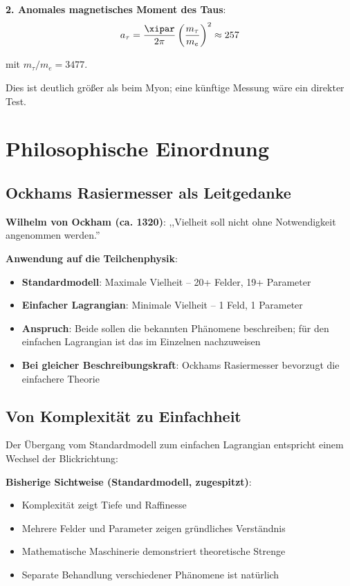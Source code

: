 	\textbf{2. Anomales magnetisches Moment des Taus}:
	\begin{equation}
		a_{\tau} = \frac{\xipar}{2\pi} \left(\frac{m_{\tau}}{m_e}\right)^2 \approx 257
	\end{equation}
	
	mit $m_\tau/m_e = 3477$.
	
	Dies ist deutlich größer als beim Myon; eine künftige Messung wäre ein direkter Test.
	
	\section{Philosophische Einordnung}
	
	\subsection{Ockhams Rasiermesser als Leitgedanke}
	
	\begin{tcolorbox}[colback=blue!5!white,colframe=blue!75!black,title=Ockhams Rasiermesser]
		\textbf{Wilhelm von Ockham (ca. 1320)}: ,,Vielheit soll nicht ohne Notwendigkeit angenommen werden.''
		
		\textbf{Anwendung auf die Teilchenphysik}:
		\begin{itemize}
			\item \textbf{Standardmodell}: Maximale Vielheit -- 20+ Felder, 19+ Parameter
			\item \textbf{Einfacher Lagrangian}: Minimale Vielheit -- 1 Feld, 1 Parameter
			\item \textbf{Anspruch}: Beide sollen die bekannten Phänomene beschreiben; für den einfachen Lagrangian ist das im Einzelnen nachzuweisen
			\item \textbf{Bei gleicher Beschreibungskraft}: Ockhams Rasiermesser bevorzugt die einfachere Theorie
		\end{itemize}
	\end{tcolorbox}
	
	\subsection{Von Komplexität zu Einfachheit}
	
	Der Übergang vom Standardmodell zum einfachen Lagrangian entspricht einem Wechsel der Blickrichtung:
	
	\textbf{Bisherige Sichtweise (Standardmodell, zugespitzt)}:
	\begin{itemize}
		\item Komplexität zeigt Tiefe und Raffinesse
		\item Mehrere Felder und Parameter zeigen gründliches Verständnis
		\item Mathematische Maschinerie demonstriert theoretische Strenge
		\item Separate Behandlung verschiedener Phänomene ist natürlich
	\end{itemize}
	
